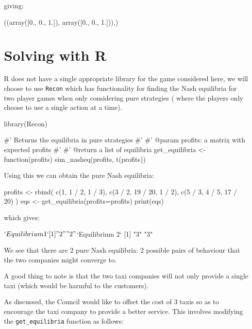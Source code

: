 giving:

\begin{pyout}
((array([0., 0., 1.]), array([0., 0., 1.])),)
\end{pyout}

\section{Solving with R}\label{sec:solving-with-R}

R does not have a single appropriate library for the game considered here, we
will choose to use \texttt{Recon} which has functionality for finding the
Nash equilibria for two player games when only considering pure strategies (
where the players only choose to use a single action at a time).

\begin{Rin}
library(Recon)

#' Returns the equilibria in pure strategies
#'
#' @param profits: a matrix with expected profits
#'
#' @return a list of equilibria
get_equilibria <- function(profits){
    sim_nasheq(profits, t(profits))
}
\end{Rin}

Using this we can obtain the pure Nash equilibria:

\begin{Rin}

profits <- rbind(
        c(1, 1 / 2, 1 / 3),
        c(3 / 2, 19 / 20, 1 / 2),
        c(5 / 3, 4 / 5, 17 / 20)
    )
eqs <- get_equilibria(profits=profits)
print(eqs)
\end{Rin}

which gives:

\begin{Rout}
$`Equilibrium 1`
[1] "2" "2"

$`Equilibrium 2`
[1] "3" "3"

\end{Rout}

We see that there are 2 pure Nash equilibria: 2 possible pairs of behaviour that the
two companies might converge to.

A good thing to note is that the two taxi
companies will not only provide a single taxi (which would be harmful to the
customers).

As discussed, the Council would like to offset the cost of 3
taxis so as to encourage the taxi company to provide a better service. This
involves modifying the \texttt{get_equilibria} function as follows:


